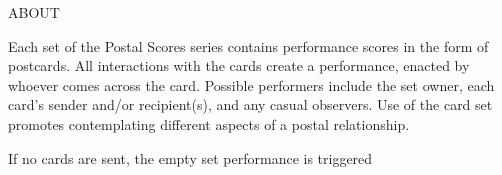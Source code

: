 \documentclass[10pt]{book}
\newcommand{\seriesTitle}{\Huge{P}\huge{OSTAL} \Huge{S}\huge{CORES}}
\newcommand{\setNumberStart}{0}
\newcommand{\setNumberEnd}{20}
\newcommand{\runDate}{20200612}
\newcommand{\multipleNum}{7}
\newcommand{\iterationNumber}{1}
\begin{document}
\begin{center}
\Large{ABOUT}\\

\medskip

\normalsize{Each set of the Postal Scores series contains performance scores in the form of postcards. } All interactions with the cards create a performance, enacted by whoever comes across the card. Possible performers include the set owner, each card's sender and/or recipient(s), and any casual observers. Use of the card set promotes contemplating different aspects of a postal relationship. 

If no cards are sent, the empty set performance is triggered
\end{center}

\end{document}
